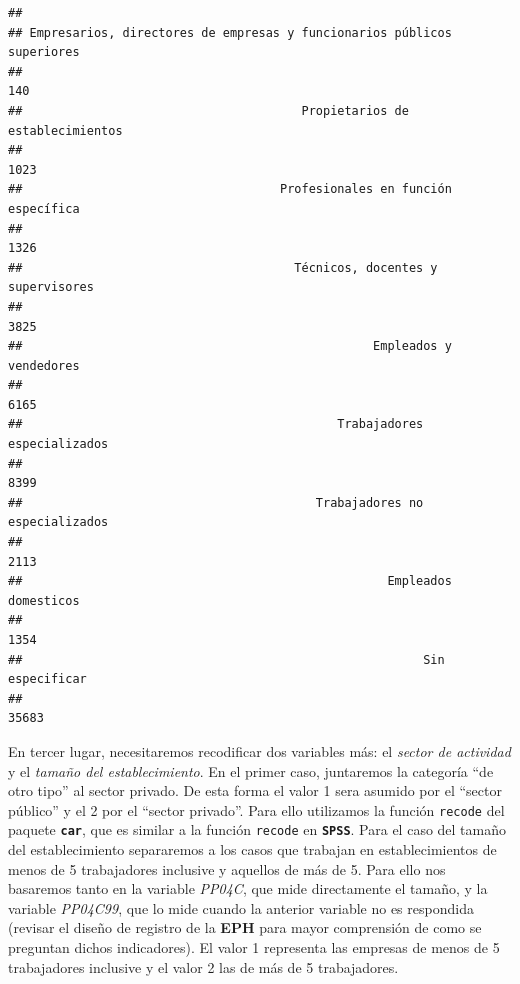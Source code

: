 \documentclass[
]{book}
\begin{document}
\begin{verbatim}
## 
## Empresarios, directores de empresas y funcionarios públicos superiores 
##                                                                    140 
##                                       Propietarios de establecimientos 
##                                                                   1023 
##                                    Profesionales en función específica 
##                                                                   1326 
##                                      Técnicos, docentes y supervisores 
##                                                                   3825 
##                                                 Empleados y vendedores 
##                                                                   6165 
##                                            Trabajadores especializados 
##                                                                   8399 
##                                         Trabajadores no especializados 
##                                                                   2113 
##                                                   Empleados domesticos 
##                                                                   1354 
##                                                        Sin especificar 
##                                                                  35683
\end{verbatim}

En tercer lugar, necesitaremos recodificar dos variables más: el \emph{sector de actividad} y el \emph{tamaño del establecimiento}. En el primer caso, juntaremos la categoría ``de otro tipo'' al sector privado. De esta forma el valor 1 sera asumido por el ``sector público'' y el 2 por el ``sector privado''. Para ello utilizamos la función \texttt{recode} del paquete \textbf{\texttt{car}}, que es similar a la función \texttt{recode} en \textbf{\texttt{SPSS}}. Para el caso del tamaño del establecimiento separaremos a los casos que trabajan en establecimientos de menos de 5 trabajadores inclusive y aquellos de más de 5. Para ello nos basaremos tanto en la variable \emph{PP04C}, que mide directamente el tamaño, y la variable \emph{PP04C99}, que lo mide cuando la anterior variable no es respondida (revisar el diseño de registro de la \textbf{EPH} para mayor comprensión de como se preguntan dichos indicadores). El valor 1 representa las empresas de menos de 5 trabajadores inclusive y el valor 2 las de más de 5 trabajadores.
\end{document}

